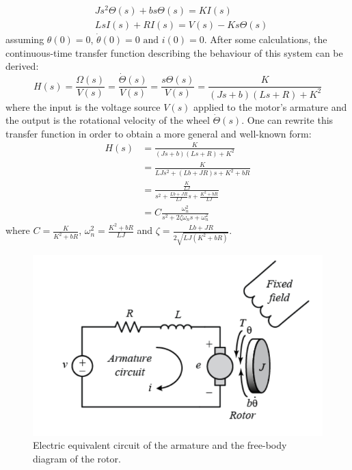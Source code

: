 \documentclass[a4paper,kul]{kulakarticle} %
\begin{document}
\begin{equation}
\begin{split}
	&Js^2\Theta(s) + bs\Theta(s) = KI(s) \\
	&LsI(s) + RI(s) = V(s) - Ks\Theta(s)	
\end{split}
\end{equation}
assuming $\theta(0) = 0$, $\dot{\theta}(0) = 0 \text{ and } i(0) = 0$. After some calculations, the continuous-time transfer function describing the behaviour of this system can be derived:
\begin{equation}
	\label{eq:TF}
    H(s) = \frac{\Omega(s)}{V(s)} = \frac{\dot{\Theta}(s)}{V(s)} = \frac{s\Theta(s)}{V(s)} = \frac{K}{(Js + b)(Ls + R) + K^2}
\end{equation}
where the input is the voltage source $V(s)$ applied to the motor's armature and the output is the rotational velocity of the wheel  $\dot{\Theta}(s)$. One can rewrite this transfer function in order to obtain a more general and well-known form:
\begin{equation}
\label{eq:TF2}
\begin{split}
	H(s) &= \frac{K}{(Js + b)(Ls + R) + K^2} \\
	 &= \frac{K}{LJs^2 + (Lb + JR)s + K^2 + bR} \\
	 &= \frac{\frac{K}{LJ}}{s^2 + \frac{Lb + JR}{LJ}s + \frac{K^2 + bR}{LJ}} \\
	 &= C \frac{\omega_n^2}{s^2 + 2\zeta\omega_ns + \omega_n^2}
\end{split}
\end{equation}
where $C = \frac{K}{K^2 + bR}$, $\omega_n^2 = \frac{K^2 + bR}{LJ}$ and $\zeta = \frac{Lb+JR}{2\sqrt{LJ(K^2 + bR)}}$.


\begin{figure}[htp!]
    \centering
    \includegraphics[width=.6\linewidth]{DC_motors.png}
    \caption{Electric equivalent circuit of the armature and the free-body diagram of the rotor.}
    \label{fig:DCmotors}
\end{figure}
\end{document}
